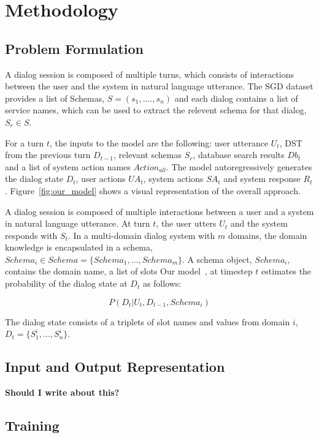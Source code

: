 \section{Methodology}

\subsection{Problem Formulation}

A dialog session is composed of multiple turns, which consists of interactions between the user and the system
in natural language utterance.
The SGD dataset provides a list of Schemas, $S = (s_1, ...., s_n)$ and each dialog contains a list of service names, which
can be used to extract the relevent schema for that dialog, $S_r \in S$.

For a turn $t$, the inputs to the model are the following: user utterance $U_t$, DST from the previous turn $D_{t-1}$, relevant schemas $S_r$, database search results $Db_t$
and a list of system action names $Action_{all}$.
The model autoregressively generates the dialog state $D_{t}$, user actions $UA_t$, system actions $SA_t$ and system response $R_t$.
Figure~\ref{fig:our_model} shows a visual representation of the overall approach.

A dialog session is composed of multiple interactions between a user and a system in natural language utterance.
At turn $t$, the user utters $U_t$ and the system responds with $S_t$. In a multi-domain dialog system with $m$ domains, the domain
knowledge is encapsulated in a schema, $Schema_i \in Schema = \{Schema_1, ..., Schema_m\}$.
A schema object, $Schema_i$, contains the domain name, a list of slots
Our model~\oursys, at timestep $t$ estimates the probability of the dialog state at $D_t$ as follows:

\begin{equation}
    P(D_t | U_t, D_{t-1}, Schema_i)
    \label{eq:dialog_state}
\end{equation}

The dialog state consists of a triplets of slot names and values from domain $i$, $D_t = \{S^i_1, ..., S^i_n\}$.

\subsection{Input and Output Representation}

\textbf{Should I write about this?}

\subsection{Training}

